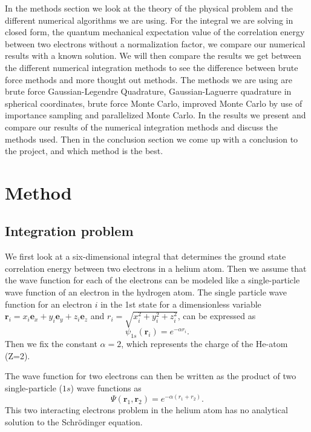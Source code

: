 \documentclass[12pt,a4paper,english]{article}
\begin{document}
In the methods section we look at the theory of the physical problem and the different numerical algorithms we are using. For the integral we are solving in closed form, the quantum mechanical expectation value of the correlation energy between two electrons without a normalization factor, we compare our numerical results with a known solution. We will then compare the results we get between the different numerical integration methods to see the difference between brute force methods and more thought out methods. The methods we are using are brute force Gaussian-Legendre Quadrature, Gaussian-Laguerre quadrature in spherical coordinates, brute force Monte Carlo, improved Monte Carlo by use of importance sampling and parallelized Monte Carlo. In the results we present and compare our results of the numerical integration methods and discuss the methods used. Then in the conclusion section we come up with a conclusion to the project, and which method is the best.

\section{Method}
\subsection{Integration problem}
We first look at a six-dimensional integral that determines the ground state correlation energy between two electrons in a helium atom. Then we assume that the wave function for each of the electrons can be modeled like a single-particle wave function of an electron in the hydrogen atom. The single particle wave function for an electron $i$ in the 1st state for a dimensionless variable $\textbf{r}_i=x_i\textbf{e}_x+y_i\textbf{e}_y+z_i\textbf{e}_z$ and $r_i=\sqrt{x_i^2+y_i^2+z_i^2}$, can be expressed as 
\begin{equation}
\label{eq:wave_func}
\psi_{1s}(\textbf{r}_i)=e^{-\alpha r_i}.
\end{equation}
Then we fix the constant $\alpha=2$, which represents the charge of the He-atom (Z=2). 

The wave function for two electrons can then be written as the product of two single-particle ($1s$) wave functions as
\begin{equation}
\label{eq:wave_2}
\Psi(\textbf{r}_1, \textbf{r}_2)=e^{-\alpha(r_1+r_2)}.
\end{equation}
This two interacting electrons problem in the helium atom has no analytical solution to the Schrödinger equation. 
\end{document}
